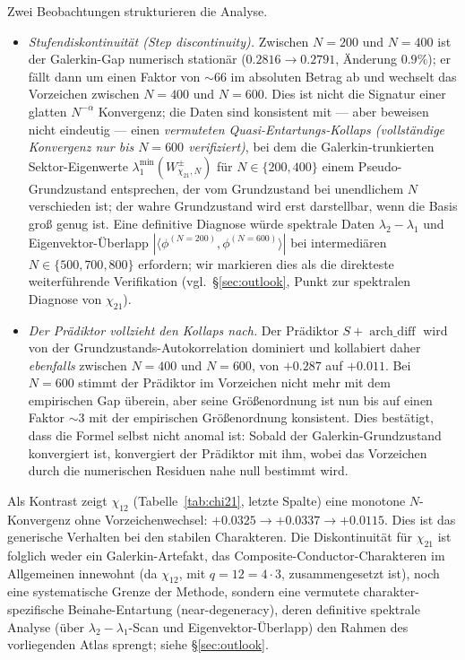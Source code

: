 \documentclass[10pt,twocolumn]{article}
\theoremstyle{definition}
\theoremstyle{remark}
\newcommand{\chifn}{\chi}
\newcommand{\archdiff}{\operatorname{arch\_diff}}
\begin{document}
Zwei Beobachtungen strukturieren die Analyse.

\begin{itemize}
  \item[(i)] \emph{Stufendiskontinuität (Step discontinuity).} Zwischen $N=200$ und $N=400$
    ist der Galerkin-Gap numerisch stationär
    ($0.2816\to 0.2791$, Änderung $0.9\%$); er fällt dann um einen Faktor
    von $\sim 66$ im absoluten Betrag ab und wechselt das Vorzeichen zwischen $N=400$
    und $N=600$. Dies ist nicht die Signatur einer glatten
    $N^{-\alpha}$ Konvergenz; die Daten sind konsistent mit --- aber
    beweisen nicht eindeutig --- einen
    \emph{vermuteten Quasi-Entartungs-Kollaps (vollständige Konvergenz nur bis $N=600$ verifiziert)},
    bei dem die Galerkin-trunkierten Sektor-Eigenwerte
    $\lambda_1^{\min}(W^\pm_{\chifn_{21},N})$ für $N\in\{200,400\}$
    einem Pseudo-Grundzustand entsprechen, der vom Grundzustand bei
    unendlichem $N$ verschieden ist; der wahre Grundzustand wird erst
    darstellbar, wenn die Basis groß genug ist. Eine definitive
    Diagnose würde spektrale Daten $\lambda_2-\lambda_1$ und
    Eigenvektor-Überlapp $|\langle\phi^{(N=200)},\phi^{(N=600)}\rangle|$
    bei intermediären $N\in\{500,700,800\}$ erfordern; wir markieren
    dies als die direkteste weiterführende Verifikation
    (vgl.\ \S\ref{sec:outlook}, Punkt zur spektralen Diagnose von
    $\chifn_{21}$).
  \item[(ii)] \emph{Der Prädiktor vollzieht den Kollaps nach.} Der Prädiktor
    $S+\archdiff$ wird von der Grundzustands-Autokorrelation dominiert
    und kollabiert daher \emph{ebenfalls} zwischen $N=400$ und $N=600$,
    von $+0.287$ auf $+0.011$. Bei $N=600$ stimmt der Prädiktor im Vorzeichen nicht mehr
    mit dem empirischen Gap überein, aber seine Größenordnung ist nun
    bis auf einen Faktor $\sim 3$ mit der empirischen Größenordnung konsistent.
    Dies bestätigt, dass die Formel selbst nicht
    anomal ist: Sobald der Galerkin-Grundzustand konvergiert ist,
    konvergiert der Prädiktor mit ihm, wobei das Vorzeichen durch die
    numerischen Residuen nahe null bestimmt wird.
\end{itemize}

Als Kontrast zeigt $\chifn_{12}$ (Tabelle~\ref{tab:chi21}, letzte Spalte)
eine monotone $N$-Konvergenz ohne Vorzeichenwechsel:
$+0.0325\to+0.0337\to+0.0115$. Dies ist das generische Verhalten bei den
stabilen Charakteren. Die Diskontinuität für $\chifn_{21}$ ist folglich
weder ein Galerkin-Artefakt, das Composite-Conductor-Charakteren im Allgemeinen innewohnt
(da $\chifn_{12}$, mit $q=12=4\cdot 3$,
zusammengesetzt ist), noch eine systematische Grenze der Methode, sondern eine
vermutete charakter-spezifische Beinahe-Entartung (near-degeneracy),
deren definitive spektrale Analyse (über $\lambda_2-\lambda_1$-Scan
und Eigenvektor-Überlapp) den Rahmen des vorliegenden Atlas sprengt;
siehe \S\ref{sec:outlook}.
\end{document}
